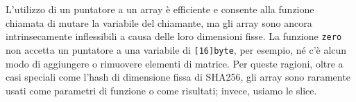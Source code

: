 \documentclass[../../thesis.tex]{subfiles}
\begin{document}
    L'utilizzo di un puntatore a un array è efficiente e consente alla funzione chiamata di mutare la variabile del chiamante, ma gli array sono ancora intrinsecamente inflessibili a causa delle loro dimensioni fisse.
    La funzione \verb"zero" non accetta un puntatore a una variabile di \verb"[16]byte", per esempio, né c'è alcun modo di aggiungere o rimuovere elementi di matrice.
    Per queste ragioni, oltre a casi speciali come l'hash di dimensione fissa di SHA256, gli array sono raramente usati come parametri di funzione o come risultati;
    invece, usiamo le slice.
\end{document}
